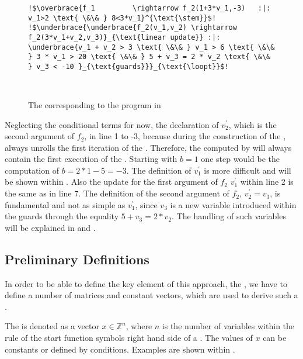\begin{figure}[H]
	
	\begin{lstlisting}[linewidth=1.2\textwidth, escapechar = !]
!$\overbrace{f_1	     \rightarrow f_2(1+3*v_1,-3)   :|: v_1>2 \text{ \&\& } 8<3*v_1}^{\text{\stem}}$!
!$\underbrace{\underbrace{f_2(v_1,v_2) \rightarrow f_2(3*v_1+v_2,v_3)}_{\text{linear update}} :|: \underbrace{v_1 + v_2 > 3 \text{ \&\& } v_1 > 6 \text{ \&\& } 3 * v_1 > 20 \text{ \&\& } 5 + v_3 = 2 * v_2 \text{ \&\& } v_3 < -10 }_{\text{guards}}}_{\text{\loopt}}$!

	
	\end{lstlisting}

	\caption{The \its corresponding to the  program in }
	\label{fig:structure-example-TRS}
\end{figure}
 Neglecting the conditional terms for now, the declaration of $v^\prime_2$, which is the second argument of $f_2$, in line 1 to -3, 
 because during the construction of the \seg, \aprove always unrolls the first iteration of the \loopt. Therefore, the \stem computed by \aprove will always contain the first execution of the \loopt. Starting with $b=1$ one step would be the computation of $b = 2*1-5=-3$. The definition of $v^\prime_1$ is more difficult and will be shown within .
Also the update for the first argument of $f_2$ $v^\prime_1$ within line 2 is the same as in  line 7. The definition of the second argument of $f_2$, $v^\prime_2 = v_3$, is fundamental and not as simple as $v^\prime_1$, since $v_3$ is a new variable introduced within the guards through the equality $5+v_3=2*v_2$. The handling of such variables will be explained in  and . \newline

\subsection{Preliminary Definitions}
In order to be able to define the key element of this approach, the \gna, we have to define a number of matrices and constant vectors, which are used to derive such a \gna. 

\begin{definition}[\stem]
	The \stem is denoted as a vector $x \in \mathbb{Z}^n$, where $n$ is the number of variables within the rule of the start function symbols right hand side of a \its. The values of $x$ can be constants or defined by conditions. Examples are shown within .
\end{definition}

